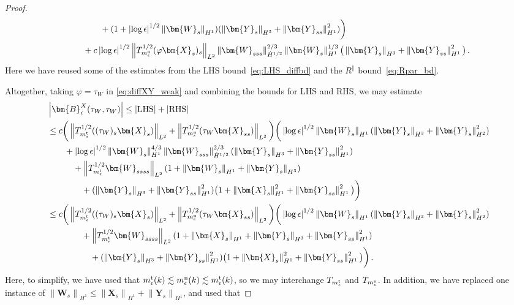 \documentclass[11pt,reqno]{amsart}
\newcommand{\X}{\bm{X}}
\newcommand{\Y}{\bm{Y}}
\newcommand{\abs}[1]{\left\lvert #1 \right\rvert}
\newcommand{\norm}[1]{\left\lVert #1 \right\rVert}
\numberwithin{equation}{section}
\theoremstyle{definition}
\begin{document}
\begin{proof}
\begin{equation}
\begin{aligned}
  &\qquad\qquad +(1+\abs{\log\epsilon}^{1/2}\norm{\bm{W}_s}_{H^1})(\norm{\Y_s}_{H^3}+\norm{\Y_{ss}}_{H^1}^2) \bigg) \\
  &\qquad + c\abs{\log\epsilon}^{1/2}\norm{T_{m_\epsilon^{\rm n}}^{1/2}(\varphi\X_s)_s}_{L^2}\norm{\bm{W}_{sss}}_{\dot H^{1/2}}^{2/3}\norm{\bm{W}_s}_{H^1}^{1/3}\big( \norm{\Y_s}_{H^3}+ \norm{\Y_{ss}}_{H^1}^2\big)\,.
\end{aligned}
\end{equation}
Here we have reused some of the estimates from the LHS bound~\eqref{eq:LHS_diffbd} and the $R^\parallel$ bound~\eqref{eq:Rpar_bd}.



Altogether, taking $\varphi=\tau_W$ in \eqref{eq:diffXY_weak} and combining the bounds for LHS and RHS, we may estimate 
\begin{equation}\label{eq:BXtautau}
\begin{aligned}
  &\abs{\bm{B}_\epsilon^X(\tau_W,\tau_W)}\le \abs{\rm LHS} + \abs{\rm RHS}\\
  &\le c\bigg( \norm{T_{m_\epsilon^{\rm t}}^{1/2}((\tau_W)_s\X_s)}_{L^2} + 
  \norm{T_{m_\epsilon^{\rm n}}^{1/2}(\tau_W\X_{ss})}_{L^2}\bigg)\bigg(\abs{\log\epsilon}^{1/2}\norm{\bm{W}_s}_{H^1}(\norm{\Y_s}_{H^3}+\norm{\Y_s}_{H^2}^2)\\
  &\qquad  + \abs{\log\epsilon}^{1/2}\norm{\bm{W}_s}_{H^1}^{4/3}\norm{\bm{W}_{sss}}_{\dot H^{1/2}}^{2/3}(\norm{\Y_s}_{H^3}+\norm{\Y_{ss}}_{H^1}^2)\\
  &\qquad\quad + \norm{T_{m_\epsilon^{\rm t}}^{1/2}\bm{W}_{ssss}}_{L^2}(1+\norm{\bm{W}_s}_{H^1}+\norm{\Y_s}_{H^3})\\
  &\qquad\qquad + (\norm{\Y_s}_{H^3}+\norm{\Y_{ss}}_{H^1}^2)\big(1 + \norm{\X_s}_{H^1}^2 + \norm{\Y_{ss}}_{H^1}^2\big)\bigg)\\
  &\le c\bigg( \norm{T_{m_\epsilon^{\rm t}}^{1/2}((\tau_W)_s\X_s)}_{L^2} + 
  \norm{T_{m_\epsilon^{\rm n}}^{1/2}(\tau_W\X_{ss})}_{L^2}\bigg)\bigg(\abs{\log\epsilon}^{1/2}\norm{\bm{W}_s}_{H^1}(\norm{\Y_s}_{H^3}+\norm{\Y_s}_{H^2}^2)\\
  &\qquad\qquad  + \norm{T_{m_\epsilon^{\rm t}}^{1/2}\bm{W}_{ssss}}_{L^2}(1+\norm{\X_s}_{H^1}+\norm{\Y_s}_{H^3}+\norm{\Y_{ss}}_{H^1}^2)\\
  &\qquad\qquad\quad + (\norm{\Y_s}_{H^3}+\norm{\Y_{ss}}_{H^1}^2)\big(1 + \norm{\X_s}_{H^1}^2 + \norm{\Y_{ss}}_{H^1}^2\big)\bigg)\,.
\end{aligned}
\end{equation}
Here, to simplify, we have used that $m_\epsilon^{\rm t}(k)\lesssim m_\epsilon^{\rm n}(k) \lesssim m_\epsilon^{\rm t}(k)$, so we may interchange $T_{m_\epsilon^{\rm t}}$ and $T_{m_\epsilon^{\rm n}}$. In addition, we have replaced one instance of $\norm{\bm{W}_s}_{H^1}\le \norm{\X_s}_{H^1}+\norm{\Y_s}_{H^1}$, and used that

\end{proof}
\end{document}
